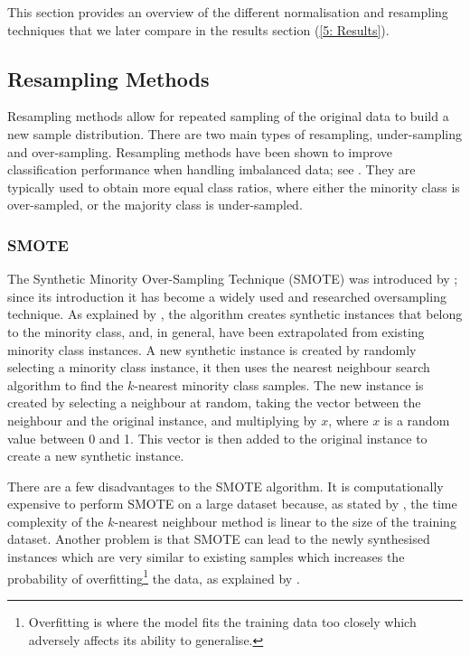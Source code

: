         This section provides an overview of the different normalisation and resampling techniques that we later compare in the results section (\ref{5: Results}).
        
        \subsection{Resampling Methods}
            Resampling methods allow for repeated sampling of the original data to build a new sample distribution. There are two main types of resampling, under-sampling and over-sampling. Resampling methods have been shown to improve classification performance when handling imbalanced data; see \cite{imbalance_methods}. They are typically used to obtain more equal class ratios, where either the minority class is over-sampled, or the majority class is under-sampled.  
            
            \subsubsection{SMOTE} \label{SMOTE}
                The Synthetic Minority Over-Sampling Technique (SMOTE) was introduced by \cite{SMOTE}; since its introduction it has become a widely used and researched oversampling technique. As explained by \cite{imbalance_methods_2}, the algorithm creates synthetic instances that belong to the minority class, and, in general, have been extrapolated from existing minority class instances. A new synthetic instance is created by randomly selecting a minority class instance, it then uses the nearest neighbour search algorithm to find the $k$-nearest minority class samples. The new instance is created by selecting a neighbour at random, taking the vector between the neighbour and the original instance, and multiplying by $x$, where $x$ is a random value between 0 and 1. This vector is then added to the original instance to create a new synthetic instance. 
                
                There are a few disadvantages to the SMOTE algorithm. It is computationally expensive to perform SMOTE on a large dataset because, as stated by \cite{knn}, the time complexity of the $k$-nearest neighbour method is linear to the size of the training dataset. Another problem is that SMOTE can lead to the newly synthesised instances which are very similar to existing samples which increases the probability of overfitting\footnote{Overfitting is where the model fits the training data too closely which adversely affects its ability to generalise.} the data, as explained by \cite{imbalance_methods_2}.
                
